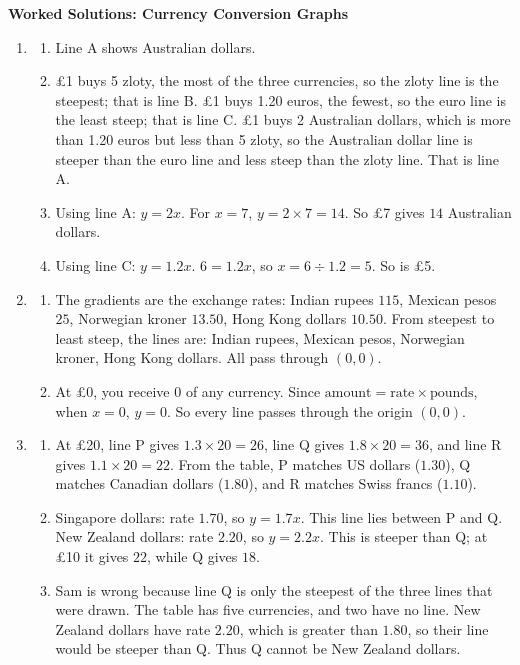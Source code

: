 \documentclass[12pt,a4paper]{article}
\newcommand{\heading}[1]{\vspace{8pt}{\large\bfseries #1}\par\vspace{2pt}}
\begin{document}
\begin{center}
{\LARGE\bfseries Worked Solutions: Currency Conversion Graphs}
\end{center}
\vspace{6pt}

\heading{Part 1: Which line shows which currency?}

\begin{enumerate}[label=\textbf{Q\arabic*.}, leftmargin=*]
\setcounter{enumi}{0}
\item 
\begin{enumerate}
\item Line A shows Australian dollars.
\item \pounds1 buys 5 zloty, the most of the three currencies, so the zloty line is the steepest; that is line B. \pounds1 buys 1.20 euros, the fewest, so the euro line is the least steep; that is line C. \pounds1 buys 2 Australian dollars, which is more than 1.20 euros but less than 5 zloty, so the Australian dollar line is steeper than the euro line and less steep than the zloty line. That is line A.
\item Using line A: \(y=2x\). For \(x=7\), \(y=2\times7=14\). So \pounds7 gives \(14\) Australian dollars.
\item Using line C: \(y=1.2x\). \(6=1.2x\), so \(x=6\div1.2=5\). So  is \pounds5.
\end{enumerate}

\item
\begin{enumerate}
\item The gradients are the exchange rates: Indian rupees \(115\), Mexican pesos \(25\), Norwegian kroner \(13.50\), Hong Kong dollars \(10.50\). From steepest to least steep, the lines are: Indian rupees, Mexican pesos, Norwegian kroner, Hong Kong dollars. All pass through \((0,0)\).
\item At \pounds0, you receive \(0\) of any currency. Since \(\text{amount}=\text{rate}\times\text{pounds}\), when \(x=0\), \(y=0\). So every line passes through the origin \((0,0)\).
\end{enumerate}

\item
\begin{enumerate}
\item At \pounds20, line P gives \(1.3\times20=26\), line Q gives \(1.8\times20=36\), and line R gives \(1.1\times20=22\). From the table, P matches US dollars (\(1.30\)), Q matches Canadian dollars (\(1.80\)), and R matches Swiss francs (\(1.10\)).
\item Singapore dollars: rate \(1.70\), so \(y=1.7x\). This line lies between P and Q. New Zealand dollars: rate \(2.20\), so \(y=2.2x\). This is steeper than Q; at \pounds10 it gives \(22\), while Q gives \(18\).
\item Sam is wrong because line Q is only the steepest of the three lines that were drawn. The table has five currencies, and two have no line. New Zealand dollars have rate \(2.20\), which is greater than \(1.80\), so their line would be steeper than Q. Thus Q cannot be New Zealand dollars.
\end{enumerate}
\end{enumerate}
\end{document}
